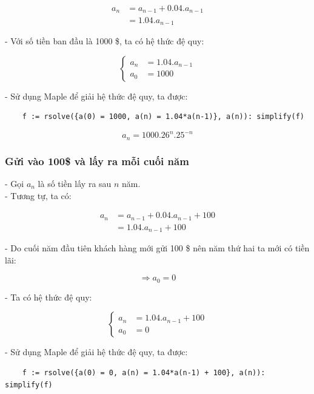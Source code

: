 \documentclass[12pt]{article}
\begin{document}
\begin{sloppypar}
\begin{align*}
    a_{n}   & = a_{n-1} + 0.04.a_{n-1} \\
            & = 1.04.a_{n-1}
\end{align*}


- Với số tiền ban đầu là 1000 \$, ta có hệ thức đệ quy:

\[
    \begin{cases}
        a_{n} & = 1.04.a_{n-1} \\             
        a_{0} & = 1000
    \end{cases}
    \]

- Sử dụng Maple để giải hệ thức đệ quy, ta được:

\begin{verbatim}
    f := rsolve({a(0) = 1000, a(n) = 1.04*a(n-1)}, a(n)): simplify(f)
\end{verbatim}

\begin{equation*}
    a_{n} = 1000.26^{n}.25^{-n}
\end{equation*}

\subsubsection{Gửi vào 100\$ và lấy ra mỗi cuối năm}

- Gọi \(a_{n}\) là số tiền lấy ra sau \(n\) năm. \\
- Tương tự, ta có:

\begin{align*}
    a_{n}   & = a_{n-1} + 0.04.a_{n-1} + 100 \\
            & = 1.04.a_{n-1} + 100
\end{align*}

- Do cuối năm đầu tiên khách hàng mới gửi 100 \$ nên năm thứ hai ta mới có tiền lãi:

\begin{equation*}
    \Rightarrow a_{0} = 0
\end{equation*}

- Ta có hệ thức đệ quy:

\[
    \begin{cases}
        a_{n} & = 1.04.a_{n-1} + 100 \\             
        a_{0} & = 0
    \end{cases} 
    \]

- Sử dụng Maple để giải hệ thức đệ quy, ta được:

\begin{verbatim}
    f := rsolve({a(0) = 0, a(n) = 1.04*a(n-1) + 100}, a(n)): simplify(f)
\end{verbatim}


\end{sloppypar}
\end{document}
